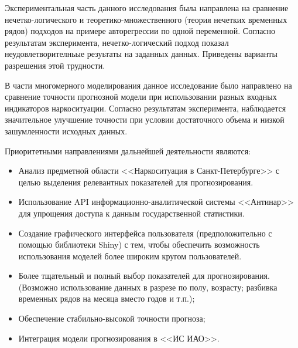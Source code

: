 Экспериментальная часть данного исследования была направлена на сравнение нечетко-логического и теоретико-множественного (теория нечетких временных рядов) подходов на примере авторегрессии по одной переменной. Согласно результатам эксперимента, нечетко-логический подход показал неудовлетворителньые резуьтаты на заданных данных. Приведены варианты разрешения этой трудности.

В части многомерного моделирования данное исследование было направлено на
сравнение точности прогнозной модели при использовании разных входных
индикаторов наркоситуации.  Согласно результатам эксперимента, наблюдается
значительное улучшение точности при условии достаточного объема и низкой
зашумленности исходных данных. 

Приоритетными направлениями дальнейшей деятельности являются:
\begin{itemize}
	\item Анализ предметной области <<Наркоситуация в Санкт-Петербурге>> с целью выделения релевантных показателей для прогнозирования.
	\item Использование API информационно-аналитической системы <<Антинар>> для упрощения доступа к данным государственной статистики.
	\item Создание графического интерфейса пользователя (предположительно с помощью библиотеки Shiny) с тем, чтобы обеспечить возможность использования моделей более широким кругом пользователей.
    \item Более тщательный и полный выбор показателей для прогнозирования. 
        (Возможно использование данных в разрезе по полу, возрасту; разбивка 
        временных рядов на месяца вместо годов и т.п.);
    \item Обеспечение стабильно-высокой точности прогноза;
    \item Интеграция модели прогнозирования в <<ИС ИАО>>.
\end{itemize}
	 

